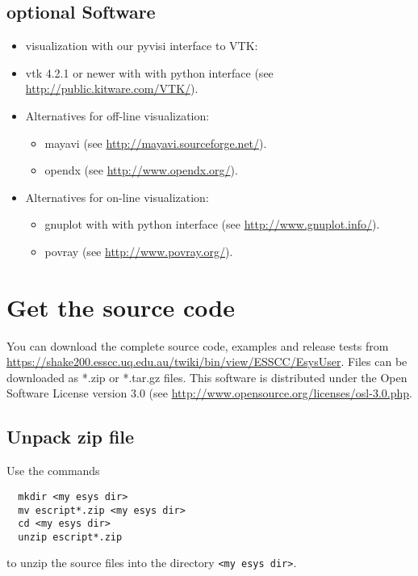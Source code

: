 \subsection{optional Software}

\begin{itemize}
   \item visualization with our pyvisi interface to VTK:
      \item vtk  4.2.1 or newer with with python interface (see \url{http://public.kitware.com/VTK/}).
   \item Alternatives for off-line visualization:
      \begin{itemize}
      \item mayavi (see \url{http://mayavi.sourceforge.net/}).
      \item opendx (see \url{http://www.opendx.org/}).
      \end{itemize}
   \item Alternatives for on-line visualization:
\begin{itemize}
      \item gnuplot  with with python interface (see \url{http://www.gnuplot.info/}).
      \item  povray (see \url{http://www.povray.org/}).
\end{itemize}
\end{itemize}

\section{Get the source code}

You can download the complete source code, examples and release tests from \url{https://shake200.esscc.uq.edu.au/twiki/bin/view/ESSCC/EsysUser}.
Files can be downloaded as *.zip or *.tar.gz files. 
This software is distributed under the Open Software License version 3.0 (see \url{http://www.opensource.org/licenses/osl-3.0.php}.

\subsection{Unpack zip file}
Use the commands

\begin{verbatim}
  mkdir <my esys dir>
  mv escript*.zip <my esys dir>
  cd <my esys dir>
  unzip escript*.zip
\end{verbatim}

to unzip the source files into the directory  \verb|<my esys dir>|.

